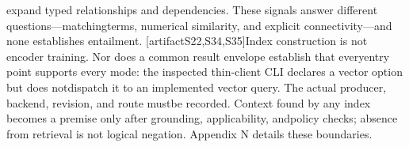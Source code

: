 \noindent
expand typed relationships and dependencies. These signals answer different questions---matching\linebreak[4]
terms, numerical similarity, and explicit connectivity---and none establishes entailment. [artifact\linebreak[4]
S22,S34,S35]\linebreak[4]
Index construction is not encoder training. Nor does a common result envelope establish that every\linebreak[4]
entry point supports every mode: the inspected thin-client CLI declares a vector option but does not\linebreak[4]
dispatch it to an implemented vector query. The actual producer, backend, revision, and route must\linebreak[4]
be recorded. Context found by any index becomes a premise only after grounding, applicability, and\linebreak[4]
policy checks; absence from retrieval is not logical negation. Appendix N details these boundaries.\par


